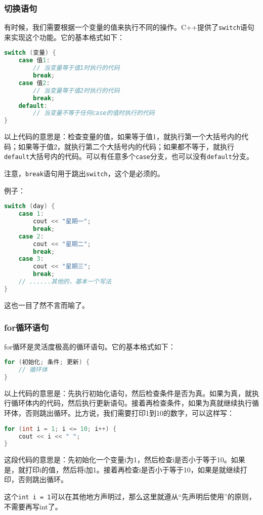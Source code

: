 \subsubsection{切换语句}
有时候，我们需要根据一个变量的值来执行不同的操作。C++提供了\texttt{switch}语句来实现这个功能。它的基本格式如下：
\begin{lstlisting}[language=C++]
switch (变量) {
    case 值1:
        // 当变量等于值1时执行的代码
        break;
    case 值2:
        // 当变量等于值2时执行的代码
        break;
    default:
        // 当变量不等于任何case的值时执行的代码
}
\end{lstlisting}
以上代码的意思是：检查变量的值，如果等于值1，就执行第一个大括号内的代码；如果等于值2，就执行第二个大括号内的代码；如果都不等于，就执行\texttt{default}大括号内的代码。可以有任意多个\texttt{case}分支，也可以没有\texttt{default}分支。

注意，\texttt{break}语句用于跳出\texttt{switch}，这个是必须的。

例子：
\begin{lstlisting}[language=C++]
switch (day) {
    case 1:
        cout << "星期一";
        break;
    case 2:
        cout << "星期二";
        break;
    case 3:
        cout << "星期三";
        break;
    // ......其他的，基本一个写法
}
\end{lstlisting}
这也一目了然不言而喻了。

\subsubsection{for循环语句}

for循环是灵活度极高的循环语句。它的基本格式如下：
\begin{lstlisting}[language=C++]
for (初始化; 条件; 更新) {
    // 循环体
}
\end{lstlisting}
以上代码的意思是：先执行初始化语句，然后检查条件是否为真。如果为真，就执行循环体内的代码，然后执行更新语句。接着再检查条件，如果为真就继续执行循环体，否则跳出循环。比方说，我们需要打印1到10的数字，可以这样写：
\begin{lstlisting}[language=C++]
for (int i = 1; i <= 10; i++) {
    cout << i << " ";
}
\end{lstlisting}
这段代码的意思是：先初始化一个变量i为1，然后检查i是否小于等于10。如果是，就打印i的值，然后将i加1。接着再检查i是否小于等于10，如果是就继续打印，否则跳出循环。

这个\texttt{int i = 1}可以在其他地方声明过，那么这里就遵从“先声明后使用”的原则，不需要再写int了。

